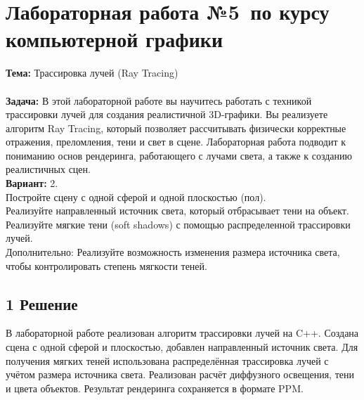 \documentclass[12pt]{article}
\begin{document}




\section*{Лабораторная работа №5\, по курсу компьютерной графики}

\textbf{Тема:} Трассировка лучей (Ray Tracing)\\
\\
\textbf{Задача:} В этой лабораторной работе вы научитесь работать с техникой трассировки лучей для
создания реалистичной 3D-графики. Вы реализуете алгоритм Ray Tracing, который позволяет
рассчитывать физически корректные отражения, преломления, тени и свет в сцене.
Лабораторная работа подводит к пониманию основ рендеринга, работающего с лучами
света, а также к созданию реалистичных сцен.\\
\textbf{Вариант:} 2. \\
Постройте сцену с одной сферой и одной плоскостью (пол).\\
Реализуйте направленный источник света, который отбрасывает тени на объект.\\
Реализуйте мягкие тени (soft shadows) с помощью распределенной трассировки лучей.\\
Дополнительно: Реализуйте возможность изменения размера источника света, чтобы
контролировать степень мягкости теней.\\

\subsection*{1 Решение}
В лабораторной работе реализован алгоритм трассировки лучей на C++. 
Создана сцена с одной сферой и плоскостью, добавлен направленный источник света. 
Для получения мягких теней использована распределённая трассировка лучей с учётом размера источника света. 
Реализован расчёт диффузного освещения, тени и цвета объектов. Результат рендеринга сохраняется в формате PPM.
\end{document}
